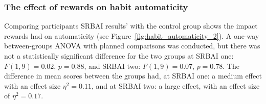 \documentclass{scaffold/sigchi}
\begin{document}
\subsubsection{The effect of rewards on habit automaticity}
Comparing participants SRBAI results' with the control group shows the impact rewards had on automaticity (see Figure~\ref{fig:habit_automaticity_2}).
A one-way between-groups ANOVA with planned comparisons was conducted, but there was not a statistically significant difference for the two groups at SRBAI one: $F(1,9) = 0.02$, $p = 0.88$, and SRBAI two: $F(1,9) = 0.07$, $p = 0.78$. The difference in mean scores between the groups had, at SRBAI one: a medium effect with an effect size $\eta^{2} = 0.11$, and at SRBAI two: a large effect, with an effect size of $\eta^{2} = 0.17$.
\end{document}
